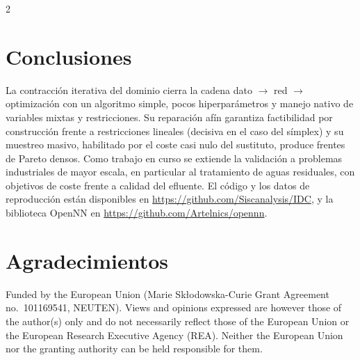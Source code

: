 \documentclass[5p,times,authoryear]{sciarticle}
\begin{document}
\begin{multicols}{2}
\section{Conclusiones}
La contracción iterativa del dominio cierra la cadena dato $\to$ red
$\to$ optimización con un algoritmo simple, pocos hiperparámetros y
manejo nativo de variables mixtas y restricciones. Su reparación afín
garantiza factibilidad por construcción frente a restricciones lineales
(decisiva en el caso del símplex) y su muestreo masivo, habilitado por el
coste casi nulo del sustituto, produce frentes de Pareto densos.
Como trabajo en curso se extiende la validación a problemas industriales
de mayor escala, en particular al tratamiento de aguas residuales, con
objetivos de coste frente a calidad del efluente. El código
y los datos de reproducción están disponibles en
\url{https://github.com/Siscanalysis/IDC}, y la biblioteca OpenNN en
\url{https://github.com/Artelnics/opennn}.

\section*{Agradecimientos}
Funded by the European Union (Marie Sk\l{}odowska-Curie Grant Agreement
no.\ 101169541, NEUTEN). Views and opinions expressed are however
those of the author(s) only and do not necessarily reflect those of the
European Union or the European Research Executive Agency (REA). Neither
the European Union nor the granting authority can be held responsible for
them.




\end{multicols}
\end{document}
